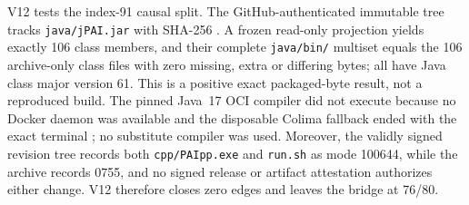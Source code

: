 V12 tests the index-91 causal split.  The GitHub-authenticated immutable tree
tracks \texttt{java/jPAI.jar} with SHA-256
.
A frozen read-only projection yields exactly 106 class members, and their
complete \texttt{java/bin/} multiset equals the 106 archive-only class files
with zero missing, extra or differing bytes; all have Java class major version
61.  This is a positive exact packaged-byte result, not a reproduced build.
The pinned Java~17 OCI compiler did not execute because no Docker daemon was
available and the disposable Colima fallback ended with the exact terminal
; no substitute compiler was used.  Moreover, the
validly signed revision tree records both \texttt{cpp/PAIpp.exe} and
\texttt{run.sh} as mode 100644, while the archive records 0755, and no signed
release or artifact attestation authorizes either change.  V12 therefore closes
zero edges and leaves the bridge at 76/80.

